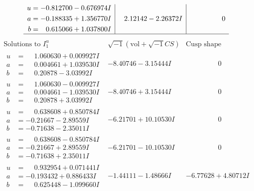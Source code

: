 \documentclass[1p]{elsarticle_modified}
\theoremstyle{definition}
\newcommand{\I}{\sqrt{-1}}
\begin{document}
$$\begin{array}{c|c|c}
\begin{aligned}
u &= -0.812700 - 0.676974 I \\
a &= -0.188335 + 1.356770 I \\
b &= \phantom{-}0.615066 + 1.037800 I\end{aligned}
 & \phantom{-}2.12142 - 2.26372 I & \phantom{-0.000000 } 0\\
 \hline 
 \end{array}$$\newpage$$\begin{array}{c|c|c}  
\text{Solutions to }I^u_{1}& \I (\text{vol} + \sqrt{-1}CS) & \text{Cusp shape}\\
 \hline 
\begin{aligned}
u &= \phantom{-}1.060630 + 0.009927 I \\
a &= \phantom{-}0.004661 + 1.039530 I \\
b &= \phantom{-}0.20878 - 3.03992 I\end{aligned}
 & -8.40746 - 3.15444 I & \phantom{-0.000000 } 0 \\ \hline\begin{aligned}
u &= \phantom{-}1.060630 - 0.009927 I \\
a &= \phantom{-}0.004661 - 1.039530 I \\
b &= \phantom{-}0.20878 + 3.03992 I\end{aligned}
 & -8.40746 + 3.15444 I & \phantom{-0.000000 } 0 \\ \hline\begin{aligned}
u &= \phantom{-}0.638608 + 0.850784 I \\
a &= -0.21667 - 2.89559 I \\
b &= -0.71638 - 2.35011 I\end{aligned}
 & -6.21701 + 10.10530 I & \phantom{-0.000000 } 0 \\ \hline\begin{aligned}
u &= \phantom{-}0.638608 - 0.850784 I \\
a &= -0.21667 + 2.89559 I \\
b &= -0.71638 + 2.35011 I\end{aligned}
 & -6.21701 - 10.10530 I & \phantom{-0.000000 } 0 \\ \hline\begin{aligned}
u &= \phantom{-}0.932954 + 0.071441 I \\
a &= -0.193432 + 0.886433 I \\
b &= \phantom{-}0.625448 - 1.099660 I\end{aligned}
 & -1.44111 - 1.48666 I & -6.77628 + 4.80712 I \\ \hline\begin{aligned}

\end{aligned}
\end{array}$$
\end{document}
